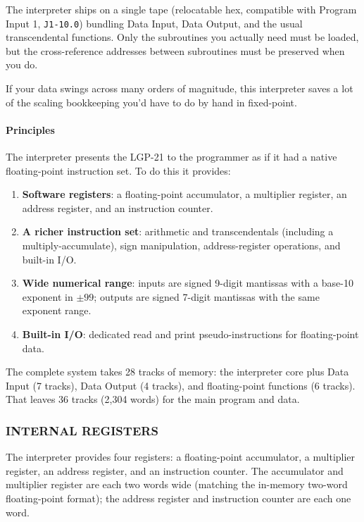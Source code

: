 The interpreter ships on a single tape (relocatable hex, compatible with Program Input 1, \texttt{J1-10.0}) bundling Data Input, Data Output, and the usual transcendental functions. Only the subroutines you actually need must be loaded, but the cross-reference addresses between subroutines must be preserved when you do.

If your data swings across many orders of magnitude, this interpreter saves a lot of the scaling bookkeeping you'd have to do by hand in fixed-point.

\paragraph{Principles}
The interpreter presents the LGP-21 to the programmer as if it had a native floating-point instruction set. To do this it provides:

\begin{enumerate}
    \item \textbf{Software registers}: a floating-point accumulator, a multiplier register, an address register, and an instruction counter.
    \item \textbf{A richer instruction set}: arithmetic and transcendentals (including a multiply-accumulate), sign manipulation, address-register operations, and built-in I/O.
    \item \textbf{Wide numerical range}: inputs are signed 9-digit mantissas with a base-10 exponent in $\pm 99$; outputs are signed 7-digit mantissas with the same exponent range.
    \item \textbf{Built-in I/O}: dedicated read and print pseudo-instructions for floating-point data.
\end{enumerate}

The complete system takes 28 tracks of memory: the interpreter core plus Data Input (7 tracks), Data Output (4 tracks), and floating-point functions (6 tracks). That leaves 36 tracks (2,304 words) for the main program and data.

\subsubsection*{INTERNAL REGISTERS}

The interpreter provides four registers: a floating-point accumulator, a multiplier register, an address register, and an instruction counter. The accumulator and multiplier register are each two words wide (matching the in-memory two-word floating-point format); the address register and instruction counter are each one word.

